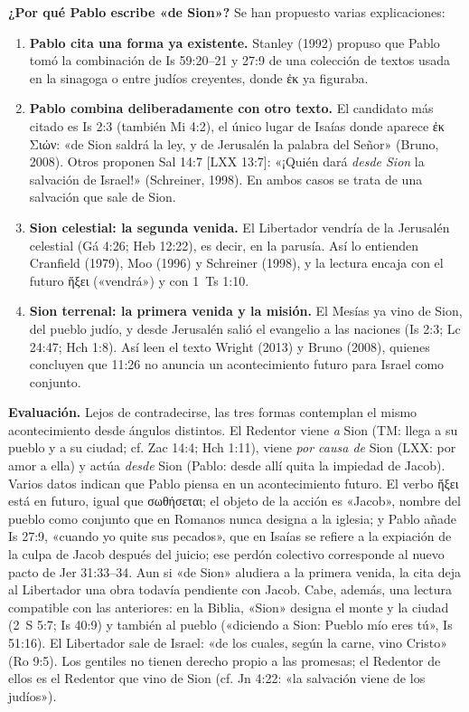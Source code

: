 \documentclass[11pt,letterpaper]{article}
\newcommand{\grc}[1]{\foreignlanguage{ancientgreek}{#1}}
\begin{document}
\textbf{¿Por qué Pablo escribe «de Sion»?} Se han propuesto varias explicaciones:
\begin{enumerate}
\item \textbf{Pablo cita una forma ya existente.} Stanley (1992) propuso que Pablo tomó la combinación de Is 59:20--21 y 27:9 de una colección de textos usada en la sinagoga o entre judíos creyentes, donde \grc{ἐκ} ya figuraba.
\item \textbf{Pablo combina deliberadamente con otro texto.} El candidato más citado es Is 2:3 (también Mi 4:2), el único lugar de Isaías donde aparece \grc{ἐκ Σιών}: «de Sion saldrá la ley, y de Jerusalén la palabra del Señor» (Bruno, 2008). Otros proponen Sal 14:7 [LXX 13:7]: «¡Quién dará \emph{desde Sion} la salvación de Israel!» (Schreiner, 1998). En ambos casos se trata de una salvación que sale de Sion.
\item \textbf{Sion celestial: la segunda venida.} El Libertador vendría de la Jerusalén celestial (Gá 4:26; Heb 12:22), es decir, en la parusía. Así lo entienden Cranfield (1979), Moo (1996) y Schreiner (1998), y la lectura encaja con el futuro \grc{ἥξει} («vendrá») y con 1~Ts 1:10.
\item \textbf{Sion terrenal: la primera venida y la misión.} El Mesías ya vino de Sion, del pueblo judío, y desde Jerusalén salió el evangelio a las naciones (Is 2:3; Lc 24:47; Hch 1:8). Así leen el texto Wright (2013) y Bruno (2008), quienes concluyen que 11:26 no anuncia un acontecimiento futuro para Israel como conjunto.
\end{enumerate}

\textbf{Evaluación.} Lejos de contradecirse, las tres formas contemplan el mismo acontecimiento desde ángulos distintos. El Redentor viene \emph{a} Sion (TM: llega a su pueblo y a su ciudad; cf. Zac 14:4; Hch 1:11), viene \emph{por causa de} Sion (LXX: por amor a ella) y actúa \emph{desde} Sion (Pablo: desde allí quita la impiedad de Jacob). Varios datos indican que Pablo piensa en un acontecimiento futuro. El verbo \grc{ἥξει} está en futuro, igual que \grc{σωθήσεται}; el objeto de la acción es «Jacob», nombre del pueblo como conjunto que en Romanos nunca designa a la iglesia; y Pablo añade Is 27:9, «cuando yo quite sus pecados», que en Isaías se refiere a la expiación de la culpa de Jacob después del juicio; ese perdón colectivo corresponde al nuevo pacto de Jer 31:33--34. Aun si «de Sion» aludiera a la primera venida, la cita deja al Libertador una obra todavía pendiente con Jacob. Cabe, además, una lectura compatible con las anteriores: en la Biblia, «Sion» designa el monte y la ciudad (2~S 5:7; Is 40:9) y también al pueblo («diciendo a Sion: Pueblo mío eres tú», Is 51:16). El Libertador sale de Israel: «de los cuales, según la carne, vino Cristo» (Ro 9:5). Los gentiles no tienen derecho propio a las promesas; el Redentor de ellos es el Redentor que vino de Sion (cf. Jn 4:22: «la salvación viene de los judíos»).
\end{document}
